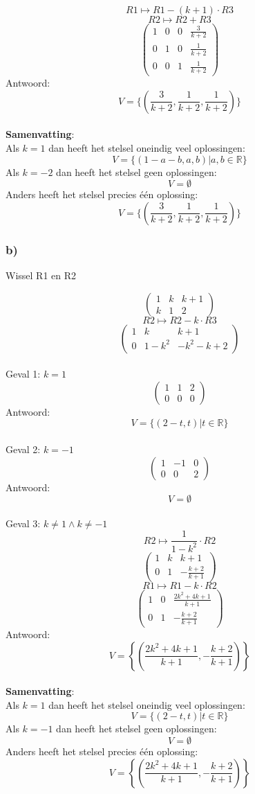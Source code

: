 \documentclass[10pt,a4paper]{article}
\begin{document}
\[ R1 \longmapsto R1 - (k+1)\cdot R3\]
\[ R2 \longmapsto R2 + R3\]
\[
\begin{pmatrix}
1 &  0 &  0 & \frac{3}{k+2}\\
0 &  1 &  0 & \frac{1}{k+2}\\
0 &  0 &  1 & \frac{1}{k+2}
\end{pmatrix}
\]
Antwoord:
\[
V=\{(\frac{3}{k+2},\frac{1}{k+2},\frac{1}{k+2})\}
\]\\
\textbf{Samenvatting}:\\
Als $k=1$ dan heeft het stelsel oneindig veel oplossingen:
\[
V=\{ (1-a-b,a,b) | a,b \in \mathbb{R}\}
\]
Als $k=-2$ dan heeft het stelsel geen oplossingen:
\[
V=\emptyset
\]
Anders heeft het stelsel precies één oplossing:
\[
V=\{(\frac{3}{k+2},\frac{1}{k+2},\frac{1}{k+2})\}
\]

\subsubsection*{b)}
\begin{center}
Wissel R1 en R2
\end{center}
\[
\begin{pmatrix}
1 &  k &  k+1\\
k &  1 &  2
\end{pmatrix}
\]
\[ R2 \longmapsto R2 - k\cdot R3\]
\[
\begin{pmatrix}
1 &  k &  k+1\\
0 &  1-k^2 &  -k^2-k+2
\end{pmatrix}
\]\\
Geval 1: $k=1$\\
\[
\begin{pmatrix}
1 &  1 &  2\\
0 &  0 &  0
\end{pmatrix}
\]
Antwoord:
\[
V=\{(2-t,t) | t \in \mathbb{R}\}
\]\\
Geval 2: $k=-1$\\
\[
\begin{pmatrix}
1 & -1 &  0\\
0 &  0 &  2
\end{pmatrix}
\]
Antwoord:
\[
V=\emptyset
\]\\
Geval 3: $k\neq 1 \wedge k\neq -1$\\
\[ R2 \longmapsto \frac{1}{1-k^2}\cdot R2 \]
\[
\begin{pmatrix}
1 &  k &  k+1\\
0 &  1 &  -\frac{k+2}{k+1}
\end{pmatrix}
\]
\[ R1 \longmapsto R1-k\cdot R2 \]
\[
\begin{pmatrix}
1 &  0 &  \frac{2k^2+4k+1}{k+1}\\
0 &  1 &  -\frac{k+2}{k+1}
\end{pmatrix}
\]
Antwoord:
\[
V=\left\lbrace\left(\frac{2k^2+4k+1}{k+1},-\frac{k+2}{k+1}\right)\right\rbrace
\]\\
\textbf{Samenvatting}:\\
Als $k=1$ dan heeft het stelsel oneindig veel oplossingen:
\[
V=\{(2-t,t) | t \in \mathbb{R}\}
\]
Als $k=-1$ dan heeft het stelsel geen oplossingen:
\[
V=\emptyset
\]
Anders heeft het stelsel precies één oplossing:
\[
V=\left\lbrace\left(\frac{2k^2+4k+1}{k+1},-\frac{k+2}{k+1}\right)\right\rbrace
\]
\end{document}
